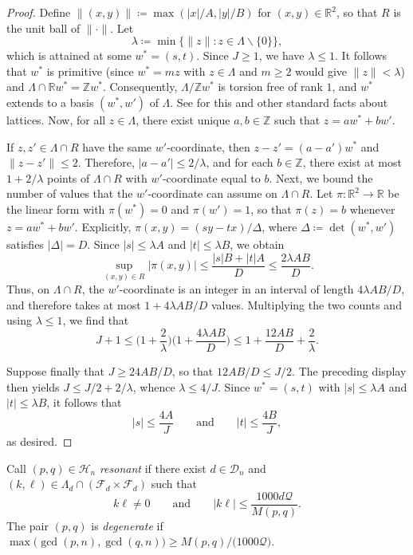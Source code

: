 \documentclass[12pt]{amsart}
\theoremstyle{definition}
\newcommand{\Z}{\mathbb{Z}}
\newcommand{\R}{\mathbb{R}}
\begin{document}
\begin{proof}
Define $\|(x,y)\|\coloneq \max(|x|/A,|y|/B)$ for $(x,y)\in\R^2$, so that $R$ is the unit ball of $\|\cdot\|$.  Let
\[
\lambda\coloneq \min\{\|z\|\colon z\in\Lambda\smallsetminus\{0\}\},
\]
which is attained at some $w^{\ast}=(s,t)$.  Since $J\ge1$, we have $\lambda\le1$.  It follows that $w^{\ast}$ is primitive (since $w^{\ast}=mz$ with $z\in\Lambda$ and $m\ge2$ would give $\|z\|<\lambda$) and $\Lambda\cap\R w^{\ast}=\Z w^{\ast}$.  Consequently, $\Lambda/\Z w^{\ast}$ is torsion free of rank $1$, and $w^{\ast}$ extends to a basis $(w^{\ast},w')$ of $\Lambda$.  See \cite{Cassels} for this and other standard facts about lattices.  Now, for all $z\in\Lambda$, there exist unique $a,b\in\Z$ such that $z=aw^{\ast}+bw'$.

If $z,z'\in\Lambda\cap R$ have the same $w'$-coordinate, then $z-z'=(a-a')w^{\ast}$ and $\|z-z'\|\le2$.  Therefore, $|a-a'|\le2/\lambda$, and for each $b\in\Z$, there exist at most $1+2/\lambda$ points of $\Lambda\cap R$ with $w'$-coordinate equal to $b$.  Next, we bound the number of values that the $w'$-coordinate can assume on $\Lambda\cap R$.  Let $\pi\colon\R^2\to\R$ be the linear form with $\pi(w^{\ast})=0$ and $\pi(w')=1$, so that $\pi(z)=b$ whenever $z=aw^{\ast}+bw'$.  Explicitly, $\pi(x,y)=(sy-tx)/\Delta$, where $\Delta\coloneq\det(w^{\ast},w')$ satisfies $|\Delta|=D$.  Since $|s|\le\lambda A$ and $|t|\le\lambda B$, we obtain
\[
\sup_{(x,y)\in R}|\pi(x,y)|\le\frac{|s|B+|t|A}{D}\le\frac{2\lambda AB}{D}.
\]
Thus, on $\Lambda\cap R$, the $w'$-coordinate is an integer in an interval of length $4\lambda AB/D$, and therefore takes at most $1+4\lambda AB/D$ values.  Multiplying the two counts and using $\lambda\le1$, we find that
\[
J+1\le\Big(1+\frac{2}{\lambda}\Big)\Big(1+\frac{4\lambda AB}{D}\Big)
\le 1+\frac{12AB}{D}+\frac{2}{\lambda}.
\]

Suppose finally that $J\ge 24AB/D$, so that $12AB/D\le J/2$.  The preceding display then yields $J\le J/2+2/\lambda$, whence $\lambda\le 4/J$.  Since $w^{\ast}=(s,t)$ with $|s|\le\lambda A$ and $|t|\le\lambda B$, it follows that
\[
|s|\le \frac{4A}{J} \qquad\text{and}\qquad |t|\le \frac{4B}{J},
\]
as desired.
\end{proof}

Call $(p,q)\in\mathcal{H}_n$ \emph{resonant} if there exist $d\in\mathcal{D}_n$ and $(k,\ell)\in\Lambda_d\cap(\mathcal{F}_d\times \mathcal{F}_d)$ such that
\begin{equation}
\label{eqn:resonance}
k\ell\ne0\qquad\text{and}\qquad |k\ell|\le\frac{1000 d \mathcal{Q}}{M(p,q)}.
\end{equation}
The pair $(p,q)$ is \emph{degenerate} if $\max\big(\gcd(p,n),\gcd(q,n)\big)\ge M(p,q)/\big(1000 \mathcal{Q}\big)$.
\end{document}
